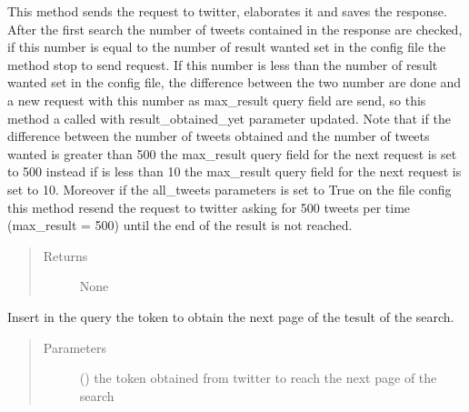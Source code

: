 \documentclass[letterpaper,10pt,english]{sphinxmanual}
\begin{document}
\begin{fulllineitems}
\begin{fulllineitems}
\label{\detokenize{code_comment/tweet_search:hate_tweet_map.tweets_searcher.SearchTweets.SearchTweets.__make}}
\sphinxAtStartPar
This method sends the request to twitter, elaborates it and saves the response.
After the first search the number of tweets contained in the response are checked,
if this number is equal to the number of result wanted set in the config file the method stop to send request.
If this number is less than the number of result wanted set in the config file, the difference between the two number are
done and a new request with this number as max\_result query field are send, so this method a called with
result\_obtained\_yet parameter updated. Note that if the difference between the number of tweets obtained and the
number of tweets wanted is greater than 500 the max\_result query field for the next request is set to 500 instead
if is less than 10 the max\_result query field for the next request is set to 10.
Moreover if the all\_tweets parameters is set to True on the file config this method resend the request to twitter
asking for 500 tweets per time (max\_result = 500) until the end of the result is not reached.
\begin{quote}\begin{description}
\item[{Returns}] \leavevmode
\sphinxAtStartPar
None

\end{description}\end{quote}

\end{fulllineitems}


\begin{fulllineitems}
\label{\detokenize{code_comment/tweet_search:hate_tweet_map.tweets_searcher.SearchTweets.SearchTweets.__next_page}}
\sphinxAtStartPar
Insert in the query the token to obtain the next page of the tesult of the search.
\begin{quote}\begin{description}
\item[{Parameters}] \leavevmode
\sphinxAtStartPar
{} (\sphinxstyleliteralemphasis{\sphinxupquote{, }}) \textendash{} the token obtained from twitter to reach the next page of the search


\end{description}
\end{quote}
\end{fulllineitems}
\end{fulllineitems}
\end{document}
